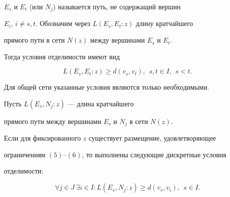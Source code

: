 $E_{s}$ и $E_{t}$ (или $N_{j}$) называется путь, не содержащий вершин


$E_{i}$, $i \neq s,t$. Обозначим через $L(E_{s},E_{t}:z)$ длину кратчайшего


прямого пути в сети $N(z)$ между вершинами $E_{s}$ и $E_{t}$.


Тогда условия отделимости имеют вид


$$


L(E_{s},E_{t}:z) \geq d(v_{s},v_{t}), \ \ s,t \in I, \ \ s < t.


$$


Для общей сети указанные условия являются только необходимыми.





Пусть $L(E_{s},N_{j}:z)$ --- длина кратчайшего


прямого пути между вершинами $E_{s}$ и $N_{j}$ в сети $N(z)$.





\begin{thmnonum}


Если для фиксированного $z$ существует размещение, удовлетворяющее


ограничениям $(5)$--$(6)$, то выполнены следующие дискретные условия 


отделимости\/${:}$


\begin{equation}


\forall j \in J \ \exists i \in I: 


L(E_{s},N_{j}:z) \geq d(v_{s},v_{i}), \ \ s \in I.


\end{equation}


\end{thmnonum}





